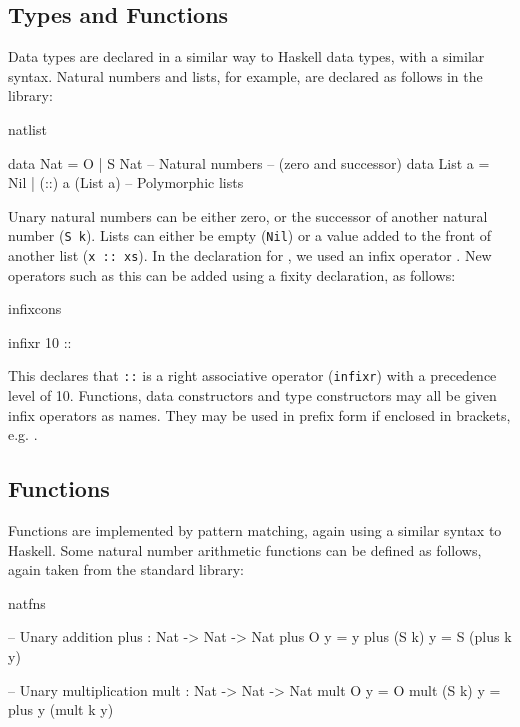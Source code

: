 \subsection{Types and Functions}

Data types are declared in a similar way to Haskell data types, with a similar
syntax. Natural numbers and lists, for example, are declared as follows in the
library:

\begin{SaveVerbatim}{natlist}

data Nat    = O   | S Nat           -- Natural numbers
                                    -- (zero and successor)
data List a = Nil | (::) a (List a) -- Polymorphic lists

\end{SaveVerbatim}

\noindent
Unary natural numbers can be either zero, or
the successor of another natural number (\texttt{S k}). 
Lists can either be empty (\texttt{Nil})
or a value added to the front of another list (\texttt{x :: xs}).
In the declaration for , we used an infix operator \tDC{::}. New operators
such as this can be added using a fixity declaration, as follows:

\begin{SaveVerbatim}{infixcons}

infixr 10 :: 

\end{SaveVerbatim}

\noindent
This declares that \texttt{::} is a right associative operator (\texttt{infixr})
with a precedence level of 10.
Functions, data constructors and type constructors may all be given infix
operators as names. They may be used in prefix form if enclosed in brackets,
e.g. \tDC{(::)}. 

\subsection{Functions}

Functions are implemented by pattern matching, again using a similar syntax to
Haskell. Some natural number arithmetic functions can be
defined as follows, again taken from the standard library:

\begin{SaveVerbatim}{natfns}

-- Unary addition
plus : Nat -> Nat -> Nat
plus O     y = y
plus (S k) y = S (plus k y)

-- Unary multiplication
mult : Nat -> Nat -> Nat
mult O     y = O
mult (S k) y = plus y (mult k y)

\end{SaveVerbatim}

